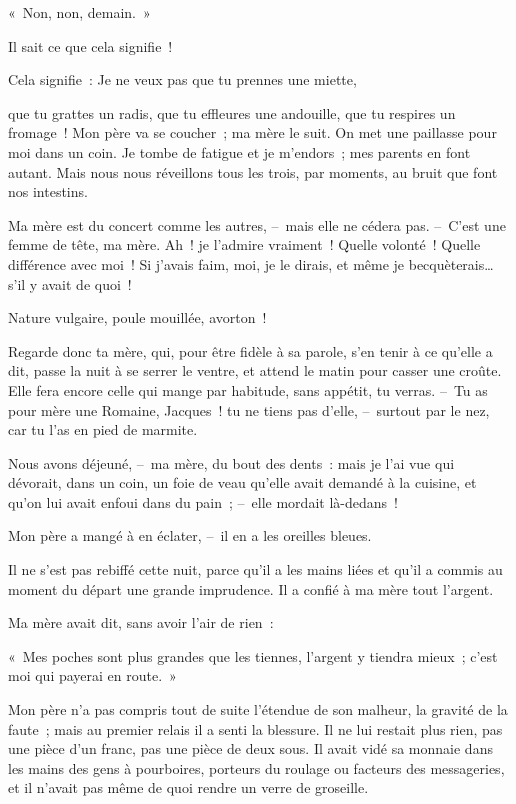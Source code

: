 \documentclass[french,twoside]{book} %
\begin{document}
« Non, non, demain. »\par
Il sait ce que cela signifie !\par
Cela signifie : Je ne veux pas que tu prennes une miette,\par
que tu grattes un radis, que tu effleures une andouille, que tu respires un fromage ! Mon père va se coucher ; ma mère le suit. On met une paillasse pour moi dans un coin. Je tombe de fatigue et je m’endors ; mes parents en font autant. Mais nous nous réveillons tous les trois, par moments, au bruit que font nos intestins.\par
Ma mère est du concert comme les autres, – mais elle ne cédera pas. – C’est une femme de tête, ma mère. Ah ! je l’admire vraiment ! Quelle volonté ! Quelle différence avec moi ! Si j’avais faim, moi, je le dirais, et même je becquèterais… s’il y avait de quoi !\par
Nature vulgaire, poule mouillée, avorton !\par
Regarde donc ta mère, qui, pour être fidèle à sa parole, s’en tenir à ce qu’elle a dit, passe la nuit à se serrer le ventre, et attend le matin pour casser une croûte. Elle fera encore celle qui mange par habitude, sans appétit, tu verras. – Tu as pour mère une Romaine, Jacques ! tu ne tiens pas d’elle, – surtout par le nez, car tu l’as en pied de marmite.\par
\bigbreak
\noindent Nous avons déjeuné, – ma mère, du bout des dents : mais je l’ai vue qui dévorait, dans un coin, un foie de veau qu’elle avait demandé à la cuisine, et qu’on lui avait enfoui dans du pain ; – elle mordait là-dedans !\par
Mon père a mangé à en éclater, – il en a les oreilles bleues.\par
Il ne s’est pas rebiffé cette nuit, parce qu’il a les mains liées et qu’il a commis au moment du départ une grande imprudence. Il a confié à ma mère tout l’argent.\par
Ma mère avait dit, sans avoir l’air de rien :\par
« Mes poches sont plus grandes que les tiennes, l’argent y tiendra mieux ; c’est moi qui payerai en route. »\par
Mon père n’a pas compris tout de suite l’étendue de son malheur, la gravité de la faute ; mais au premier relais il a senti la blessure. Il ne lui restait plus rien, pas une pièce d’un franc, pas une pièce de deux sous. Il avait vidé sa monnaie dans les mains des gens à pourboires, porteurs du roulage ou facteurs des messageries, et il n’avait pas même de quoi rendre un verre de groseille.\par
\end{document}
